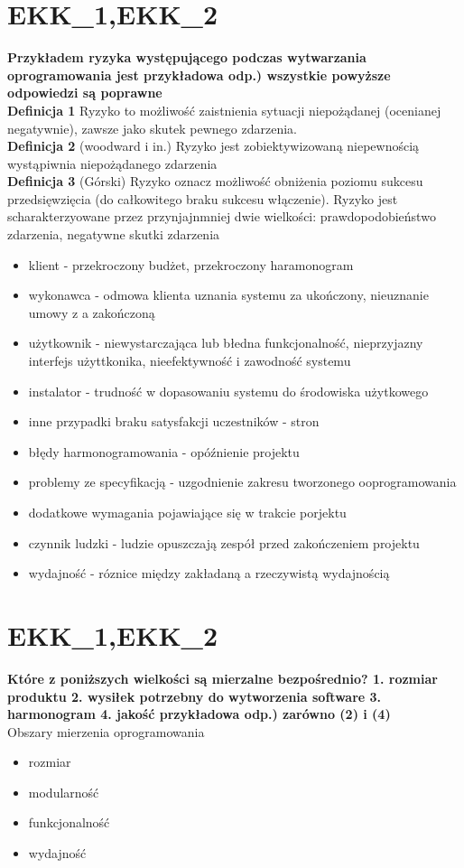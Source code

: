 \section{EKK\_1,EKK\_2}
\textbf{Przykładem ryzyka występującego podczas wytwarzania oprogramowania jest
przykładowa odp.) wszystkie powyższe odpowiedzi są poprawne}
\\
\textbf{Definicja 1} Ryzyko to możliwość zaistnienia sytuacji niepożądanej (ocenianej negatywnie), zawsze jako skutek pewnego zdarzenia.\\
\textbf{Definicja 2} (woodward i in.) Ryzyko jest zobiektywizowaną niepewnością  wystąpiwnia niepożądanego zdarzenia\\
\textbf{Definicja 3} (Górski) Ryzyko oznacz możliwość obniżenia poziomu sukcesu przedsięwzięcia (do całkowitego braku sukcesu włączenie).
Ryzyko jest scharakterzyowane przez przynjajnmniej dwie wielkości: prawdopodobieństwo zdarzenia, negatywne skutki zdarzenia
\begin{itemize}
\item klient - przekroczony budżet, przekroczony haramonogram
\item wykonawca - odmowa klienta uznania systemu za ukończony, nieuznanie umowy z a zakończoną
\item użytkownik - niewystarczająca lub błedna funkcjonalność, nieprzyjazny interfejs użyttkonika, nieefektywność i zawodność systemu
\item instalator - trudność w dopasowaniu systemu do środowiska użytkowego
\item inne przypadki braku satysfakcji uczestników - stron
\item błędy harmonogramowania - opóźnienie projektu
\item problemy ze specyfikacją - uzgodnienie zakresu tworzonego ooprogramowania
\item dodatkowe wymagania pojawiające się w trakcie porjektu
\item czynnik ludzki - ludzie opuszczają zespół przed zakończeniem projektu
\item wydajność - róznice między zakładaną a rzeczywistą wydajnością
\end{itemize}


\section{EKK\_1,EKK\_2}
\textbf{Które z poniższych wielkości są mierzalne bezpośrednio?
1. rozmiar produktu
2. wysiłek potrzebny do wytworzenia software
3. harmonogram
4. jakość
przykładowa odp.) zarówno (2) i (4)}\\
Obszary mierzenia oprogramowania
\begin{itemize}
\item rozmiar
\item modularność
\item funkcjonalność
\item wydajność
\end{itemize}